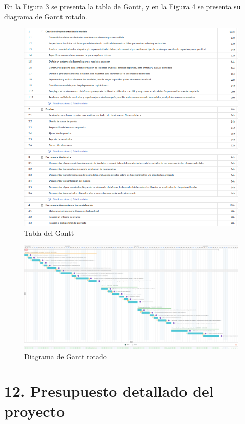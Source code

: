 \documentclass[
11pt, %
codirector, %
]{charter}
\begin{document}
En la Figura 3 se presenta la tabla de Gantt, y en la Figura 4 se presenta su diagrama de Gantt rotado.
\begin{figure}[htpb]
\centering 
\includegraphics[width=.99\linewidth]{./Figuras/tabla.png}
\caption{Tabla del Gantt}
\label{fig:diagGantt}
\end{figure}


\begin{landscape}
\begin{figure}[htpb]
\centering 
\includegraphics[width=.90\linewidth]{./Figuras/Gantt-2.png}
\caption{Diagrama de Gantt rotado}
\label{fig:diagGantt}
\end{figure}

\end{landscape}




\section{12. Presupuesto detallado del proyecto}
\label{sec:presupuesto}
\end{document}
